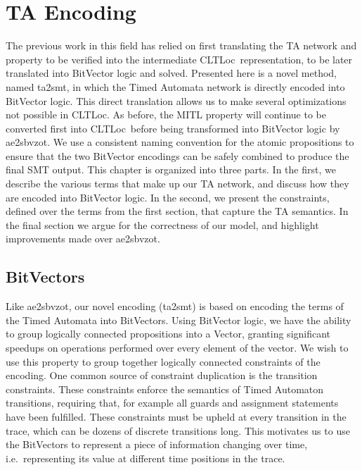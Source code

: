 \documentclass[a4paper,11pt]{report}
\theoremstyle{definition}
\newcommand{\cltloc}{CLTLoc}
\newcommand{\aez}{ae2sbvzot}
\begin{document}
\chapter{TA Encoding}\label{encoding}

The previous work in this field has relied on first translating the TA network
and property to be verified into the intermediate \cltloc\ representation, to be
later translated into BitVector logic and solved. Presented here is a novel
method, named ta2smt, in which the Timed Automata network is directly encoded
into BitVector logic. This direct translation allows us to make several
optimizations not possible in \cltloc. As before, the MITL property will
continue to be converted first into \cltloc\ before being transformed into
BitVector logic by \aez. We use a consistent naming convention for the atomic
propositions to ensure that the two BitVector encodings can be safely combined
to produce the final SMT output. This chapter is organized into three parts. In
the first, we describe the various terms that make up our TA network, and
discuss how they are encoded into BitVector logic. In the second, we present the
constraints, defined over the terms from the first section, that capture the TA
semantics. In the final section we argue for the correctness of our model, and
highlight improvements made over \aez.

\section{BitVectors}


Like \aez, our novel encoding (ta2smt) is based on encoding the terms of the
Timed Automata into BitVectors. Using BitVector logic, we have the ability to
group logically connected propositions into a Vector, granting significant
speedups on operations performed over every element of the vector. We wish to
use this property to group together logically connected constraints of the
encoding. One common source of constraint duplication is the transition
constraints. These constraints enforce the semantics of Timed Automaton
transitions, requiring that, for example all guards and assignment statements
have been fulfilled. These constraints must be upheld at every transition in the
trace, which can be dozens of discrete transitions long. This motivates us to
use the BitVectors to represent a piece of information changing over time, i.e.\
representing its value at different time positions in the trace.
\end{document}
